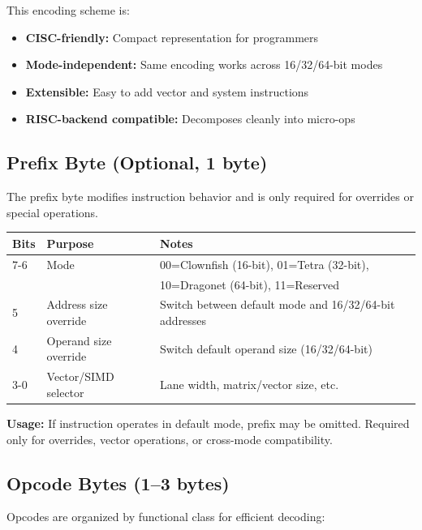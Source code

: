 \documentclass[12pt]{article}
\begin{document}
This encoding scheme is:
\begin{itemize}
    \item \textbf{CISC-friendly:} Compact representation for programmers
    \item \textbf{Mode-independent:} Same encoding works across 16/32/64-bit modes
    \item \textbf{Extensible:} Easy to add vector and system instructions
    \item \textbf{RISC-backend compatible:} Decomposes cleanly into micro-ops
\end{itemize}

\subsection{Prefix Byte (Optional, 1 byte)}

The prefix byte modifies instruction behavior and is only required for overrides or special operations.

\begin{table}[h]
\centering
\begin{tabular}{@{}lll@{}}
\toprule
\textbf{Bits} & \textbf{Purpose} & \textbf{Notes} \\ \midrule
7-6 & Mode & 00=Clownfish (16-bit), 01=Tetra (32-bit), \\
 &  & 10=Dragonet (64-bit), 11=Reserved \\
5 & Address size override & Switch between default mode and 16/32/64-bit addresses \\
4 & Operand size override & Switch default operand size (16/32/64-bit) \\
3-0 & Vector/SIMD selector & Lane width, matrix/vector size, etc. \\ \bottomrule
\end{tabular}
\end{table}

\textbf{Usage:} If instruction operates in default mode, prefix may be omitted. Required only for overrides, vector operations, or cross-mode compatibility.

\subsection{Opcode Bytes (1--3 bytes)}

Opcodes are organized by functional class for efficient decoding:
\end{document}
